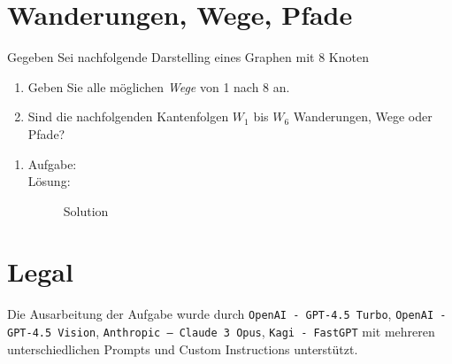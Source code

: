 \documentclass[a4paper,11pt]{report}
\begin{document}
\chapter{Wanderungen, Wege, Pfade}
Gegeben Sei nachfolgende Darstelling eines Graphen mit 8 Knoten



\begin{enumerate}
    \item Geben Sie alle möglichen \textit{Wege} von 1 nach 8 an.
    \item Sind die nachfolgenden Kantenfolgen $W_1$ bis $W_6$ Wanderungen, Wege oder Pfade?
\end{enumerate}

\begin{enumerate}
    \item \label{item:backrefA} \hfill %
    \begin{description}
        \item[Aufgabe:] 
         \hfill
        \item[Lösung:] \hfill \newline %
            Solution
    \end{description}
\end{enumerate}
\newpage

\chapter{Legal}
Die Ausarbeitung der Aufgabe wurde durch \texttt{OpenAI - GPT-4.5 Turbo}, \texttt{OpenAI - GPT-4.5 Vision}, \texttt{Anthropic -- Claude 3 Opus},  \texttt{Kagi - FastGPT} mit mehreren unterschiedlichen Prompts und Custom Instructions unterstützt.
\end{document}
